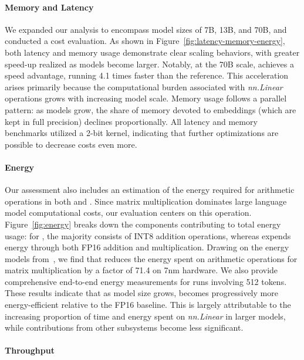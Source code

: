 \paragraph{Memory and Latency}

We expanded our analysis to encompass model sizes of 7B, 13B, and 70B, and conducted a cost evaluation. As shown in Figure~\ref{fig:latency-memory-energy}, both latency and memory usage demonstrate clear scaling behaviors, with greater speed-up realized as models become larger. Notably, at the 70B scale,  achieves a speed advantage, running 4.1 times faster than the  reference. This acceleration arises primarily because the computational burden associated with \emph{nn.Linear} operations grows with increasing model scale. Memory usage follows a parallel pattern: as models grow, the share of memory devoted to embeddings (which are kept in full precision) declines proportionally. All latency and memory benchmarks utilized a 2-bit kernel, indicating that further optimizations are possible to decrease costs even more.

\paragraph{Energy}

Our assessment also includes an estimation of the energy required for arithmetic operations in both  and . Since matrix multiplication dominates large language model computational costs, our evaluation centers on this operation. Figure~\ref{fig:energy} breaks down the components contributing to total energy usage: for , the majority consists of INT8 addition operations, whereas  expends energy through both FP16 addition and multiplication. Drawing on the energy models from~\cite{energycost, pokebnn}, we find that  reduces the energy spent on arithmetic operations for matrix multiplication by a factor of 71.4 on 7nm hardware. We also provide comprehensive end-to-end energy measurements for runs involving 512 tokens. These results indicate that as model size grows,  becomes progressively more energy-efficient relative to the FP16  baseline. This is largely attributable to the increasing proportion of time and energy spent on \emph{nn.Linear} in larger models, while contributions from other subsystems become less significant.

\paragraph{Throughput}

